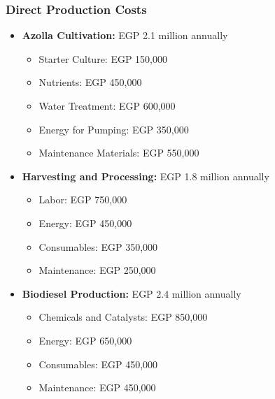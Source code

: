 \subsubsection{Direct Production Costs}
\begin{itemize}
    \item \textbf{Azolla Cultivation:} EGP 2.1 million annually
    \begin{itemize}
        \item Starter Culture: EGP 150,000
        \item Nutrients: EGP 450,000
        \item Water Treatment: EGP 600,000
        \item Energy for Pumping: EGP 350,000
        \item Maintenance Materials: EGP 550,000
    \end{itemize}
    
    \item \textbf{Harvesting and Processing:} EGP 1.8 million annually
    \begin{itemize}
        \item Labor: EGP 750,000
        \item Energy: EGP 450,000
        \item Consumables: EGP 350,000
        \item Maintenance: EGP 250,000
    \end{itemize}
    
    \item \textbf{Biodiesel Production:} EGP 2.4 million annually
    \begin{itemize}
        \item Chemicals and Catalysts: EGP 850,000
        \item Energy: EGP 650,000
        \item Consumables: EGP 450,000
        \item Maintenance: EGP 450,000
    \end{itemize}
\end{itemize}

